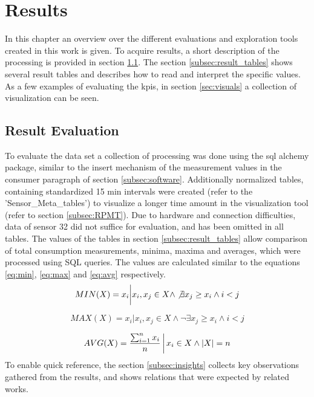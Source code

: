 \chapter{Results}\label{chap:results}

In this chapter an overview over the different evaluations and exploration tools created in this work is given. To acquire results, a short description of the processing is provided in section \ref{sec:results}. The section \ref{subsec:result_tables} shows several result tables and describes how to read and interpret the specific values.  As a few examples of evaluating the \glspl{kpi}, in section \ref{sec:visuals} a collection of visualization can be seen.
\section{Result Evaluation}\label{sec:results}
To evaluate the data set a collection of processing was done using the sql alchemy package, similar to the insert mechanism of the measurement values in the consumer paragraph of section \ref{subsec:software}. Additionally normalized tables, containing standardized 15 min intervals were created (refer to the 'Sensor\_Meta\_tables') to visualize a longer time amount in the visualization tool (refer to section \ref{subsec:RPMT}). Due to hardware and connection difficulties, data of sensor 32 did not suffice for evaluation, and has been omitted in all tables. The values of the tables in section \ref{subsec:result_tables} allow comparison of total consumption measurements, minima, maxima and averages, which were processed using SQL queries. The values are calculated similar to the equations \ref{eq:min}, \ref{eq:max} and \ref{eq:avg} respectively. 
\begin{equation}\label{eq:min}
	MIN (X) = x_i \bigg\rvert x_i, x_j \in X \wedge \not \exists x_j \geq x_i \wedge i < j
\end{equation}

\begin{equation}\label{eq:max}
	MAX (X) = x_i \bigg\rvert x_i, x_j \in X \wedge \neg \exists x_j \geq x_i \wedge i < j
\end{equation}

\begin{equation}\label{eq:avg}
	AVG (X) = \dfrac{\sum_{i=1}^{n}{x_i}}{n} \bigg\arrowvert x_i \in X \wedge |X| = n 
\end{equation}
To enable quick reference, the section \ref{subsec:insights} collects key observations gathered from the results, and shows relations that were expected by related works.
